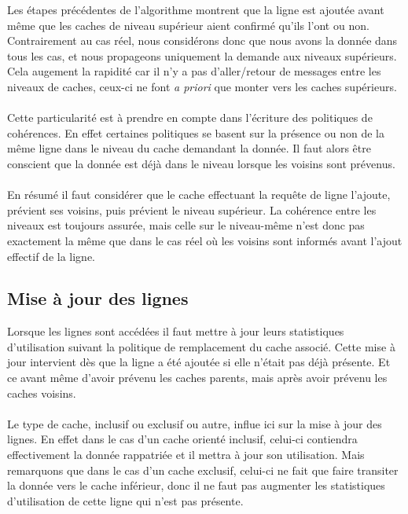 Les étapes précédentes de l'algorithme montrent que la ligne est ajoutée avant même que les caches de niveau supérieur aient confirmé qu'ils l'ont ou non. Contrairement au cas réel, nous considérons donc que nous avons la donnée dans tous les cas, et nous propageons uniquement la demande aux niveaux supérieurs. Cela augement la rapidité car il n'y a pas d'aller/retour de messages entre les niveaux de caches, ceux-ci ne font \emph{a priori} que monter vers les caches supérieurs.

\paragraph{}
Cette particularité est à prendre en compte dans l'écriture des politiques de cohérences. En effet certaines politiques se basent sur la présence ou non de la même ligne dans le niveau du cache demandant la donnée. Il faut alors être conscient que la donnée est déjà dans le niveau lorsque les voisins sont prévenus.

\paragraph{}
En résumé il faut considérer que le cache effectuant la requête de ligne l'ajoute, prévient ses voisins, puis prévient le niveau supérieur. La cohérence entre les niveaux est toujours assurée, mais celle sur le niveau-même n'est donc pas exactement la même que dans le cas réel où les voisins sont informés avant l'ajout effectif de la ligne.


\subsection{Mise à jour des lignes}

Lorsque les lignes sont accédées il faut mettre à jour leurs statistiques d'utilisation suivant la politique de remplacement du cache associé. Cette mise à jour intervient dès que la ligne a été ajoutée si elle n'était pas déjà présente. Et ce avant même d'avoir prévenu les caches parents, mais après avoir prévenu les caches voisins.

\paragraph{}
Le type de cache, inclusif ou exclusif ou autre, influe ici sur la mise à jour des lignes. En effet dans le cas d'un cache orienté inclusif, celui-ci contiendra effectivement la donnée rappatriée et il mettra à jour son utilisation. Mais remarquons que dans le cas d'un cache exclusif, celui-ci ne fait que faire transiter la donnée vers le cache inférieur, donc il ne faut pas augmenter les statistiques d'utilisation de cette ligne qui n'est pas présente.

